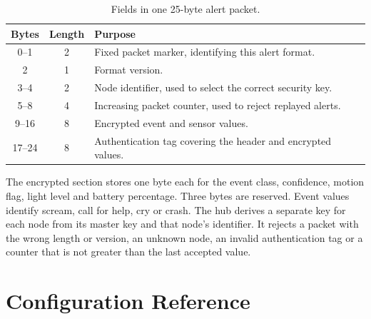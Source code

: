 \documentclass[12pt,a4paper]{report}
\begin{document}
\begin{table}[htbp]
\centering
\caption{Fields in one 25-byte alert packet.}
\label{tab:wireformat}
\renewcommand{\arraystretch}{1.18}
\begin{tabular}{|c|c|>{\raggedright\arraybackslash}p{}|}
\hline
\textbf{Bytes} & \textbf{Length} & \textbf{Purpose} \\
\hline
0--1 & 2 & Fixed packet marker, identifying this alert format. \\\hline
2 & 1 & Format version. \\\hline
3--4 & 2 & Node identifier, used to select the correct security key. \\\hline
5--8 & 4 & Increasing packet counter, used to reject replayed alerts. \\\hline
9--16 & 8 & Encrypted event and sensor values. \\\hline
17--24 & 8 & Authentication tag covering the header and encrypted values. \\\hline
\end{tabular}
\end{table}

The encrypted section stores one byte each for the event class,
confidence, motion flag, light level and battery percentage. Three
bytes are reserved. Event values identify scream, call for help, cry
or crash. The hub derives a separate key for each node from its master
key and that node's identifier. It rejects a packet with the wrong
length or version, an unknown node, an invalid authentication tag or
a counter that is not greater than the last accepted value.

\chapter{Configuration Reference}
\label{app:config}
\end{document}

